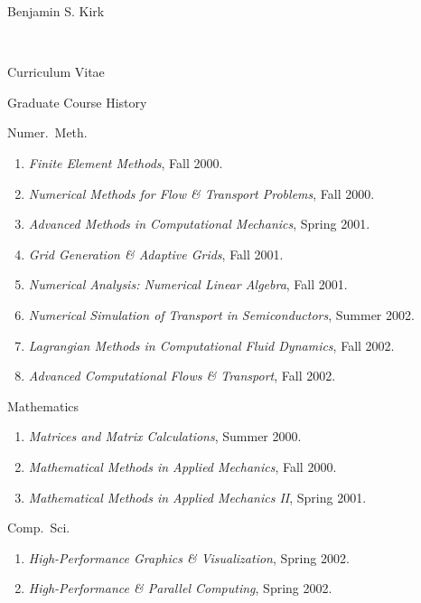 \documentclass[10pt]{report}
\begin{document}
\begin{cv}{\centerline{\Large Benjamin S. Kirk}\\
    \centerline{\large Curriculum Vitae}}
\begin{cvlist}{Graduate Course History}
      \vspace{.5em}
      \item[Numer.\ Meth.]
	\begin{enumerate}
	  \item \emph{Finite Element Methods}, Fall 2000.
	  \item \emph{Numerical Methods for Flow \& Transport Problems}, Fall 2000.
	  \item \emph{Advanced Methods in Computational Mechanics}, Spring 2001.
	  \item \emph{Grid Generation \& Adaptive Grids}, Fall 2001.
	  \item \emph{Numerical Analysis: Numerical Linear Algebra}, Fall 2001.
	  \item \emph{Numerical Simulation of Transport in Semiconductors}, Summer 2002.
	  \item \emph{Lagrangian Methods in Computational Fluid Dynamics}, Fall 2002.
	  \item \emph{Advanced Computational Flows \& Transport}, Fall 2002.
	\end{enumerate}

      \vspace{.5em}
      \item[Mathematics]

	\begin{enumerate}
  	  \item \emph{Matrices and Matrix Calculations}, Summer 2000.
	  \item \emph{Mathematical Methods in Applied Mechanics}, Fall 2000.
	  \item \emph{Mathematical Methods in Applied Mechanics II}, Spring 2001.
	\end{enumerate}

      \vspace{.5em}
      \item[Comp.\ Sci.]

	\begin{enumerate}
	  \item \emph{High-Performance Graphics \& Visualization}, Spring 2002.
	  \item \emph{High-Performance \& Parallel Computing}, Spring 2002.
	\end{enumerate}
  \end{cvlist}


\end{cv}
\end{document}
